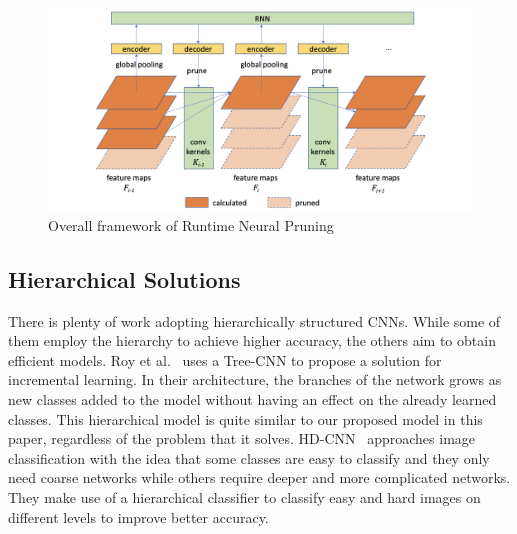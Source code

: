 \begin{figure}
    \centering
    \includegraphics[width=\textwidth]{thesis/images/runtimenp-fig.png}
    \caption{Overall framework of Runtime Neural Pruning\cite{Lin2017RuntimeNP}}
    \label{fig:runtimenp}
\end{figure}

\subsection{Hierarchical Solutions}

There is plenty of work adopting hierarchically structured CNNs. 
While some of them employ the hierarchy to achieve higher accuracy, the others aim to obtain efficient models.
Roy et al.~\cite{roy2018tree} uses a Tree-CNN to propose a solution for incremental learning. 
In their architecture, the branches of the network grows as new classes added to the model without having an effect on the already learned classes. 
This hierarchical model is quite similar to our proposed model in this paper, regardless of the problem that it solves. 
HD-CNN~\cite{Yan_2015_ICCV} approaches image classification with the idea that some classes are easy to classify and they only need coarse networks while others require deeper and more complicated networks. 
They make use of a hierarchical classifier to classify easy and hard images on different levels to improve better accuracy. 

